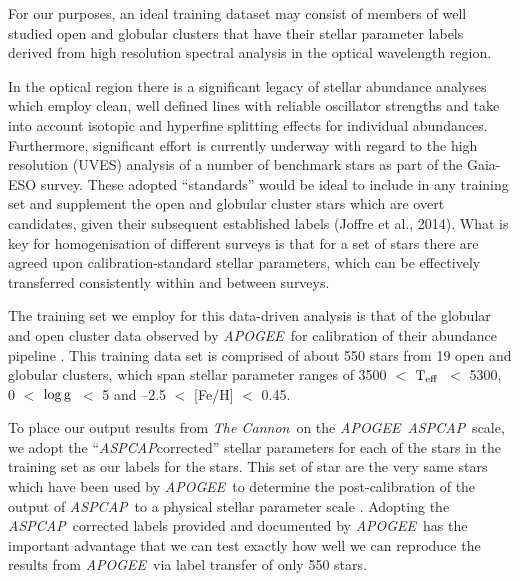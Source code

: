 \documentclass[12pt, preprint]{aastex}
\newcommand{\teff}{\mbox{$\rm T_{eff}$}}
\newcommand{\logg}{\mbox{$\rm \log g$}}
\newcommand{\tc}{\textsl{The Cannon}}
\newcommand{\apogee}{\textsl{APOGEE}}
\newcommand{\aspcap}{\textsl{ASPCAP}}
\begin{document}
For our purposes, an ideal training dataset may consist of members of
well studied open and globular clusters that have their stellar
parameter labels derived from high resolution spectral analysis in the
optical wavelength region.

In the optical region there is a significant legacy of stellar abundance analyses which employ clean, well defined lines with reliable oscillator strengths and take into account isotopic and hyperfine splitting effects for individual abundances. Furthermore, significant effort is currently underway with regard to the high resolution (UVES) analysis of a number of benchmark stars as part of the Gaia-ESO survey. These adopted ``standards'' would be ideal to include in any training set and supplement the open and globular cluster stars which are overt candidates, given their subsequent established labels (Joffre et al., 2014). What is key for homogenisation of different surveys is that for a set of stars there are agreed upon calibration-standard stellar parameters, which can be effectively transferred consistently within and between surveys.  

The training set we employ for this data-driven analysis is that of the globular and open cluster data observed by \apogee\ for calibration of their abundance pipeline \citep{Meszaros2013}. This training data set is comprised of about 550 stars from 19 open and globular clusters, which span stellar parameter ranges of 3500 $<$ \teff\ $<$ 5300, 0 $<$ \logg\ $<$ 5 and --2.5 $<$ [Fe/H] $<$ 0.45. 


To place our output results from \tc\ on the \apogee\ \aspcap\ scale, we adopt the ``\aspcap corrected'' stellar parameters for each of the stars in the training set as our labels for the stars. This set of star are the very same stars which have been used by \apogee\ to determine the post-calibration of the output of \aspcap\ to a physical stellar parameter scale \citep{Meszaros2013}. Adopting the \aspcap\ corrected labels provided and documented by \apogee\  has the important advantage that we can test exactly how well we can reproduce the results from \apogee\ via label transfer of only 550 stars.
\end{document}

